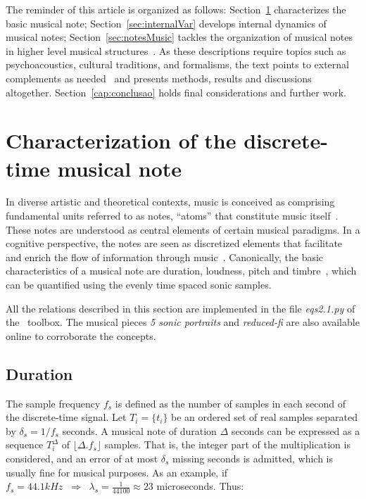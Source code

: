 The reminder of this article is organized as follows:
Section~\ref{sec:discNote} characterizes the basic musical note;
Section~\ref{sec:internalVar} develops internal dynamics of musical notes;
Section~\ref{sec:notesMusic} tackles the organization of musical notes in
higher level musical structures~\cite{Wisnick,Webern,Lerdahl,Cook,Lacerda}.
As these descriptions require topics such as psychoacoustics, cultural traditions,
and formalisms, the text points to external complements as needed~\cite{Zamacois,Schoenberg,microsound}
and presents methods, results and discussions altogether.
Section~\ref{cap:conclusao} holds final considerations and further work.

\section{Characterization of the discrete-time musical note} \label{sec:discNote}\label{sec:notaDisc}
In diverse artistic and theoretical contexts, music is conceived as comprising fundamental units referred to as notes, ``atoms'' that constitute music itself~\cite{Wisnick, Lovelock, Webern}.
These notes are understood as central elements of certain musical paradigms.
In a cognitive perspective, the notes are seen as discretized elements that facilitate and enrich the flow of information through music~\cite{Roederer, Lacerda}.
Canonically, the basic characteristics of a musical note are duration, loudness, pitch and timbre~\cite{Lacerda}, which can be quantified using the evenly time spaced sonic samples.

All the relations described in this section are implemented in the file \emph{eqs2.1.py} of the \massa\ toolbox. The musical pieces \emph{5 sonic portraits} and \emph{reduced-fi} are also available online to corroborate the concepts.

\subsection{Duration}
The sample frequency $f_s$ is defined as the number of samples in each second of the discrete-time signal. Let $T_i=\{t_i\}$ be an ordered set of real samples separated by $\delta_s=1/f_s$ seconds.
A musical note of duration $\Delta$ seconds can be expressed as a sequence $T_i^{\Delta}$ of $\lfloor \Delta . f_s \rfloor$ samples.
That is, the integer part of the multiplication is considered, and an error of at most $\delta_s$ missing seconds is admitted, which is usually fine for musical purposes. As an example, if $f_s=44.1kHz \;\;\Rightarrow\;\;\lambda_s=\frac{1}{44100}\approx 23$ microseconds. Thus:


